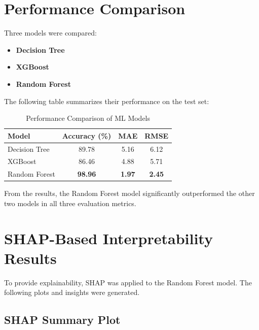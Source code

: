 \documentclass[a4paper,11pt,oneside]{book}
\begin{document}
\section{Performance Comparison}

Three models were compared:

\begin{itemize}
    \item \textbf{Decision Tree}
    \item \textbf{XGBoost}
    \item \textbf{Random Forest}
\end{itemize}

The following table summarizes their performance on the test set:

\begin{table}[h!]
\centering
\caption{Performance Comparison of ML Models}
\begin{tabular}{|l|c|c|c|}
\hline
\textbf{Model} & \textbf{Accuracy (\%)} & \textbf{MAE} & \textbf{RMSE} \\
\hline
Decision Tree & 89.78 & 5.16 & 6.12 \\
XGBoost       & 86.46 & 4.88 & 5.71 \\
Random Forest & \textbf{98.96} & \textbf{1.97} & \textbf{2.45} \\
\hline
\end{tabular}
\end{table}

From the results, the Random Forest model significantly outperformed the other two models in all three evaluation metrics.

\section{SHAP-Based Interpretability Results}

To provide explainability, SHAP was applied to the Random Forest model. The following plots and insights were generated.

\subsection{SHAP Summary Plot}
\end{document}
